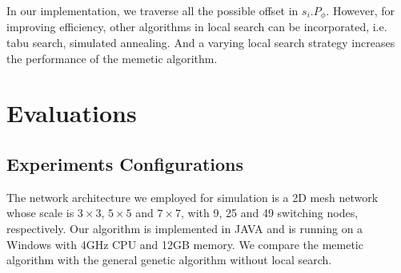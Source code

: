 \documentclass[journal]{IEEEtran}
\theoremstyle{remark}
\begin{document}
In our implementation,
 we traverse all the possible offset in $s_i.P_\phi$.
However,
 for improving efficiency,
 other algorithms in local search can be incorporated,
  i.e. tabu search, simulated annealing.
And a varying local search strategy increases the performance of the memetic algorithm.

\section{Evaluations \label{s:evalu}}

\subsection{Experiments Configurations}






The network architecture we employed for simulation is a 2D mesh network whose scale is $3\times 3$, $5\times 5$ and $7\times 7$,
 with 9, 25 and 49 switching nodes, respectively.
Our algorithm is implemented in JAVA and is running on a Windows with 4GHz CPU and 12GB memory.
We compare the memetic algorithm with the general genetic algorithm without local search. 
\end{document}
